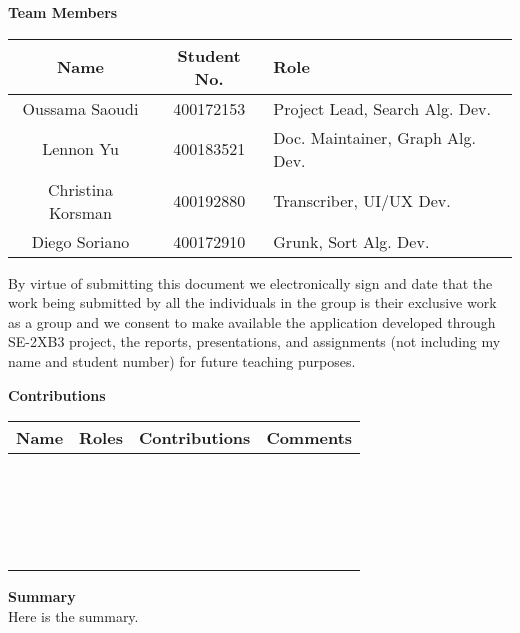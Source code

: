 \documentclass[12pt]{article}
\begin{document}
\Large \noindent \textbf{Team Members}\\
\normalsize
\begin{center}
    \begin{tabular}{|| c | c | l ||} 
    \hline
    Name & Student No. & Role\\
    \hline\hline
    Oussama Saoudi & 400172153 & Project Lead, Search Alg. Dev. \\ 
    \hline
    Lennon Yu & 400183521 & Doc. Maintainer, Graph Alg. Dev. \\
    \hline
    Christina Korsman & 400192880 & Transcriber, UI/UX Dev. \\
    \hline
    Diego Soriano & 400172910 & Grunk, Sort Alg. Dev. \\
    \hline
\end{tabular}
\end{center}

\normalsize
By virtue of submitting this document we electronically sign and date
that the work being submitted by all the individuals in the group is
their exclusive work as a group and we consent to make available the
application developed through SE-2XB3 project, the reports,
presentations, and assignments (not including my name and student number)
for future teaching purposes. 

\newpage
\Large \textbf{Contributions}
\normalsize
\begin{center}
    \begin{tabular}{|| c | c | l | p{7cm} ||} 
    \hline
    Name & Roles & Contributions & Comments\\
    \hline\hline
    ~ & ~ & ~ \\ 
    \hline
    ~ & ~ & ~ \\
    \hline
    ~ & ~ & ~ \\
    \hline
    ~ & ~ & ~ \\
    \hline
\end{tabular}
\end{center}

\newpage
\Large \noindent \textbf{Summary}\\
\normalsize
Here is the summary.

\newpage
\large
\tableofcontents

\newpage
\normalsize
\end{document}
